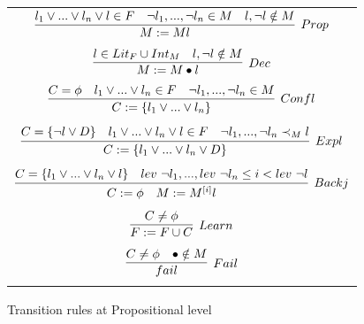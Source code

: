 \documentclass{article}
\begin{document}
\begin{figure}[t]
	\centering
	\begin{framed}
		\begin{tabular}{c}
			$\infer[Prop]{M := Ml}{l_1 \lor ... \lor l_n \lor l \in F 
				& \neg l_1,...,\neg l_n \in M & l, \neg l \notin M}$ \\ \\
			$\infer[Dec]{M := M \bullet l}
			{l \in Lit_F \cup Int_M & l, \neg l \notin M}$ \\ \\
			$\infer[Confl]{C:=\{l_1 \lor ... \lor l_n\}}
			{C = \phi & l_1 \lor ... \lor l_n \in F & \neg l_1,...,\neg l_n \in M}$ \\ \\
			$\infer[Expl]{C := \{l_1 \lor ... \lor l_n \lor D\}}
			{C = \{\neg l \lor D\} & l_1 \lor ... \lor l_n \lor l \in F 
				& \neg l_1,...,\neg l_n \prec_M l}$ \\ \\
			$\infer[Backj]{C := \phi\ \ \ M := M^{[i]}l}
			{C = \{l_1 \lor ... \lor l_n \lor l\} & 
				lev\ \neg l_1, ... , lev\ \neg l_n \leq i < lev\ \neg l}$ \\ \\
			$\infer[Learn]{F := F \cup C}{C \neq \phi}$ \\ \\
			$\infer[Fail]{fail}{C \neq \phi & \bullet \notin M}$ \\ \\
		\end{tabular}
	\end{framed}
	\caption{Transition rules at Propositional level}
	\label{fig:proprules}
\end{figure}
\end{document}
